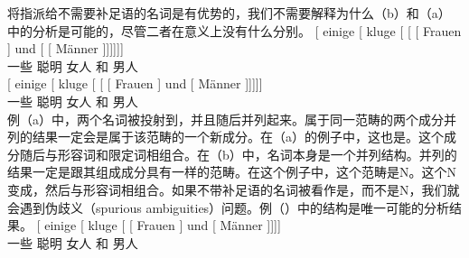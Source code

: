 将\nbarc 指派给不需要补足语的名词是有优势的，我们不需要解释为什么（b）和（a）中的分析是可能的，尽管二者在意义上没有什么分别。
\eal
\ex 
\gll {}[ einige [\sub{\nbar} kluge [\sub{\nbar} [\sub{\nbar} [ Frauen ] und  [\sub{\nbar} [ Männer ]]]]]]\\
	 {}      一些   {}           聪明 {}          {}           {}       女人  {} 和 {} {}          男人\\
\ex 
\gll {}[ einige [\sub{\nbar} kluge [\sub{\nbar} [ [ Frauen ] und [ Männer
]]]]]\\
	{}       一些   {}           聪明 {}          {}       {}       女人  {} 和 {} 男人\\
\zl
%
例（a）中，两个名词被投射到\nbarc，并且随后并列起来。属于同一范畴的两个成分并列的结果一定会是属于该范畴的一个新成分。在（a）的例子中，这也是\nbarc。这个成分随后与形容词和限定词相组合。在（b）中，名词本身是一个并列结构。并列的结果一定是跟其组成成分具有一样的范畴。在这个例子中，这个范畴是N。这个N变成\nbarc，然后与形容词相组合。如果不带补足语的名词被看作是\nbarc，而不是N，我们就会遇到伪歧义（spurious ambiguities）问题。例（）中的结构是唯一可能的分析结果。
\ea
\gll {}[ einige [\sub{\nbar} kluge [\sub{\nbar} [\sub{\nbar} Frauen ] und [\sub{\nbar} Männer
]]]]\\
      {}         一些    {}           聪明 {}          {}           女人  {}  和 {} 男人\\
\z

